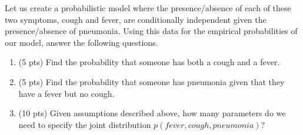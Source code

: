 \documentclass[11pt]{article}
\begin{document}
Let us create a probabilistic model where the presence/absence of each of these two symptoms, cough and fever, are conditionally independent given the presence/absence of pneumonia. Using this data for the empirical probabilities of our model, answer the following questions.
\begin{enumerate}
\item (5 pts) Find the probability that someone has both a cough and a fever.  \\
\begin{answertext}{6cm}{}


  
\end{answertext} 
\item (5 pts) Find the probability that someone has pneumonia given that they have a fever but no cough.  \\
\begin{answertext}{6cm}{}
\end{answertext} 

\newpage

\item (10 pts) Given assumptions described above, how many parameters do we need to specify the joint distribution $p(fever, cough, pneumonia)$?  \\
\begin{answertext}{6cm}{}
\end{answertext} 
\end{enumerate}


\pagebreak
\end{document}
